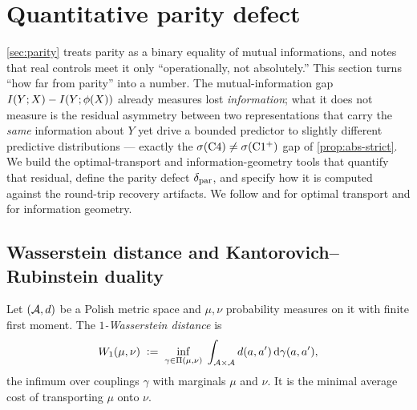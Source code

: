 \section{Quantitative parity defect}
\label{sec:parity-defect}


\cref{sec:parity} treats parity as a binary equality of mutual informations,
and notes that real controls meet it only ``operationally, not
absolutely.'' This section turns ``how far from parity'' into a number. The
mutual-information gap $I(Y ; X)-I(Y ; \phi(X))$ already measures lost
\emph{information}; what it does not measure is the residual asymmetry between
two representations that carry the \emph{same} information about $Y$ yet drive
a bounded predictor to slightly different predictive distributions --- exactly
the $\sigma\!\left(\mathrm{C}4\right)\ne\sigma\!\left(\mathrm{C1^{+}}\right)$ gap of
\cref{prop:abs-strict}. We build the optimal-transport and
information-geometry tools that quantify that residual, define the parity
defect $\delta_{\mathrm{par}}$, and specify how it is computed against the
round-trip recovery artifacts. We follow \citet{villani2009} and \citet{peyrecuturi2019}
for optimal transport and \citet{amarinagaoka2000} for information geometry.

\subsection{Wasserstein distance and Kantorovich--Rubinstein duality}
\label{subsec:wasserstein}

\begin{definition}
\label{def:wasserstein}
Let $(\mathcal{A},d)$ be a Polish metric space and $\mu,\nu$ probability measures
on it with finite first moment. The \emph{$1$-Wasserstein distance} is
\[
  W_{1}(\mu,\nu)
  \;\vcentcolon=\;
  \inf_{\gamma\in\Pi(\mu,\nu)}\;
  \int_{\mathcal{A}\times\mathcal{A}} d(a,a')\,\mathrm{d}\gamma(a,a'),
\]
the infimum over couplings $\gamma$ with marginals $\mu$ and $\nu$. It is the
minimal average cost of transporting $\mu$ onto $\nu$.
\end{definition}

